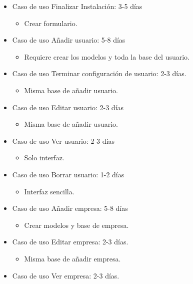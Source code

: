 \documentclass[12pt,a4paperpaper,]{report}
\providecommand{\tightlist}{%
  \setlength{\itemsep}{0pt}\setlength{\parskip}{0pt}}
\begin{document}
\begin{itemize}
\tightlist
\item
  Caso de uso Finalizar Instalación: 3-5 días

  \begin{itemize}
  \tightlist
  \item
    Crear formulario.
  \end{itemize}
\item
  Caso de uso Añadir usuario: 5-8 días

  \begin{itemize}
  \tightlist
  \item
    Requiere crear los modelos y toda la base del usuario.
  \end{itemize}
\item
  Caso de uso Terminar configuración de usuario: 2-3 días.

  \begin{itemize}
  \tightlist
  \item
    Misma base de añadir usuario.
  \end{itemize}
\item
  Caso de uso Editar usuario: 2-3 días

  \begin{itemize}
  \tightlist
  \item
    Misma base de añadir usuario.
  \end{itemize}
\item
  Caso de uso Ver usuario: 2-3 días

  \begin{itemize}
  \tightlist
  \item
    Solo interfaz.
  \end{itemize}
\item
  Caso de uso Borrar usuario: 1-2 días

  \begin{itemize}
  \tightlist
  \item
    Interfaz sencilla.
  \end{itemize}
\item
  Caso de uso Añadir empresa: 5-8 días

  \begin{itemize}
  \tightlist
  \item
    Crear modelos y base de empresa.
  \end{itemize}
\item
  Caso de uso Editar empresa: 2-3 días.

  \begin{itemize}
  \tightlist
  \item
    Misma base de añadir empresa.
  \end{itemize}
\item
  Caso de uso Ver empresa: 2-3 días.


\end{itemize}
\end{document}
